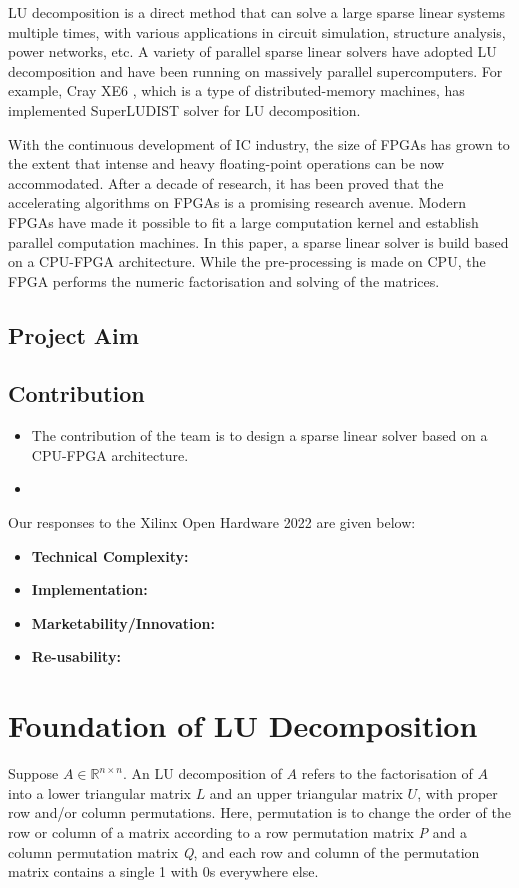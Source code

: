 \documentclass[11pt,a4paper]{article}
\begin{document}
LU decomposition is a direct method that can solve a large sparse linear systems multiple times, with various applications in circuit simulation, structure analysis, power networks, etc. A variety of parallel sparse linear solvers have adopted LU decomposition and have been running on massively parallel supercomputers. For example, Cray XE6 \cite{Kwack2016}, which is a type of distributed-memory machines, has implemented SuperLU\textunderscore DIST \cite{Li2003} solver for LU decomposition.

With the continuous development of IC industry, the size of FPGAs has grown to the extent that intense and heavy floating-point operations can be now accommodated. After a decade of research, it has been proved that the accelerating algorithms on FPGAs is a promising research avenue. Modern FPGAs have made it possible to fit a large computation kernel and establish parallel computation machines. In this paper, a sparse linear solver is build based on a CPU-FPGA architecture. While the pre-processing is made on CPU, the FPGA performs the numeric factorisation and solving of the matrices.

\subsection{Project Aim}


\subsection{Contribution}
\begin{itemize}
    \item The contribution of the team is to design a sparse linear solver based on a CPU-FPGA architecture.
    \item
\end{itemize}

Our responses to the Xilinx Open Hardware 2022 are given below:
\begin{itemize}
    \item \textbf{Technical Complexity:}
    \item \textbf{Implementation:}
    \item \textbf{Marketability/Innovation:}
    \item \textbf{Re-usability:}
\end{itemize}

\section{Foundation of LU Decomposition}
Suppose \(A\in\mathbb{R}^{n\times n}\). An LU decomposition of \(A\) refers to the factorisation of \(A\) into a lower triangular matrix \(L\) and an upper triangular matrix \(U\), with proper row and/or column permutations. Here, permutation is to change the order of the row or column of a matrix according to a row permutation matrix \emph{P} and a column permutation matrix \emph{Q}, and each row and column of the permutation matrix contains a single 1 with 0s everywhere else.
\end{document}

